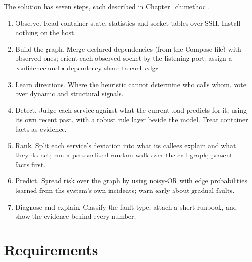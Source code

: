 The solution has seven steps, each described in Chapter~\ref{ch:method}.
\begin{enumerate}
\item Observe. Read container state, statistics and socket tables over SSH. Install nothing on the host.
\item Build the graph. Merge declared dependencies (from the Compose file) with observed ones; orient each observed socket by the listening port; assign a confidence and a dependency share to each edge.
\item Learn directions. Where the heuristic cannot determine who calls whom, vote over dynamic and structural signals.
\item Detect. Judge each service against what the current load predicts for it, using its own recent past, with a robust rule layer beside the model. Treat container facts as evidence.
\item Rank. Split each service's deviation into what its callees explain and what they do not; run a personalised random walk over the call graph; present facts first.
\item Predict. Spread risk over the graph by using noisy-OR with edge probabilities learned from the system's own incidents; warn early about gradual faults.
\item Diagnose and explain. Classify the fault type, attach a short runbook, and show the evidence behind every number.
\end{enumerate}



\section{Requirements}

